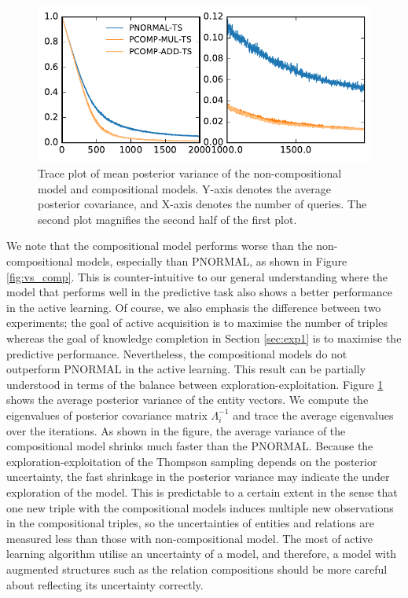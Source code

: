 \begin{figure}[t]
	\centering

	
	\includegraphics[width=0.9\linewidth]{images/posterior_variance_trace_kinship.pdf}

	\caption{\label{fig:pos_var} Trace plot of mean posterior variance of the non-compositional model and compositional models. Y-axis denotes the average posterior covariance, and X-axis denotes the number of queries. The second plot magnifies the second half of the first plot.}
\end{figure}

We note that the compositional model performs worse than the non-compositional models,
especially than PNORMAL, as shown in Figure \ref{fig:vs_comp}.
This is counter-intuitive to our general understanding where
the model that performs well in the predictive task also shows 
a better performance in the active learning. 
Of course, we also emphasis the difference between two experiments; 
the goal of active acquisition is to maximise the number of triples 
whereas the goal of knowledge completion in Section \ref{sec:exp1} is to maximise 
the predictive performance. Nevertheless, the compositional models do not outperform 
PNORMAL in the active learning.
This result can be partially understood in terms of the balance between 
exploration-exploitation. Figure \ref{fig:pos_var} shows the average posterior variance of 
the entity vectors. We compute the eigenvalues of posterior covariance matrix $\Lambda_i^{-1}$ 
and trace the average eigenvalues over the iterations. 
As shown in the figure, the average variance of the compositional model shrinks much faster 
than the PNORMAL. Because the exploration-exploitation of the Thompson sampling depends on the
posterior uncertainty, the fast shrinkage in the posterior variance may indicate the under 
exploration of the model. This is predictable to a certain extent in the sense that one new triple with the compositional models induces multiple new 
observations in the compositional triples, so the uncertainties of entities and 
relations are measured less than those with non-compositional model. The most of active 
learning algorithm utilise an uncertainty of a model, and therefore, a model with augmented 
structures such as the relation compositions should be more careful about reflecting its uncertainty correctly.


